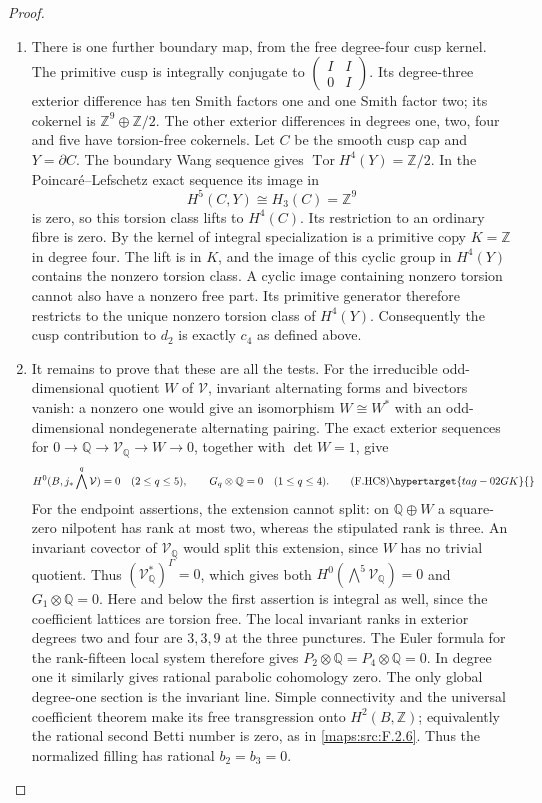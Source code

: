 \begin{proof}
\begin{enumerate}[label={$\langle1\rangle$\arabic*.}]
\item There is one further boundary map, from the free
degree-four cusp kernel.
The primitive cusp is integrally conjugate to
$\left(\begin{smallmatrix}I&I\\0&I\end{smallmatrix}\right)$.
Its degree-three exterior difference has ten Smith
factors one and one Smith factor two; its cokernel is
$\mathbb Z^9\oplus\mathbb Z/2$.
The other exterior differences in degrees one, two,
four and five have torsion-free cokernels.
Let $C$ be the smooth cusp cap and $Y=\partial C$.
The boundary Wang sequence gives
$\operatorname{Tor}H^4(Y)=\mathbb Z/2$.
In the Poincar\'e--Lefschetz exact sequence its image in
\[
 H^5(C,Y)\cong H_3(C)=\mathbb Z^9
\]
is zero, so this torsion class lifts to $H^4(C)$.
Its restriction to an ordinary fibre is zero.
By  the kernel of integral specialization is
a primitive copy $K=\mathbb Z$ in degree four.
The lift is in $K$, and the image of this cyclic group
in $H^4(Y)$ contains the nonzero torsion class.
A cyclic image containing nonzero torsion cannot
also have a nonzero free part.
Its primitive generator therefore restricts to the
unique nonzero torsion class of $H^4(Y)$.
Consequently the cusp contribution to $d_2$ is exactly $c_4$
as defined above.

\item It remains to prove that these are all the tests.
For the irreducible odd-dimensional quotient $W$
of $\mathcal V$, invariant alternating forms and
bivectors vanish: a nonzero one would give an
isomorphism $W\cong W^*$ with an odd-dimensional
nondegenerate alternating pairing.
The exact exterior sequences for
$0\to\mathbb Q\to\mathcal V_{\mathbb Q}\to W\to0$,
together with $\det W=1$, give
\[
 H^0(B,j_*\bigwedge^q\mathcal V)=0
       \quad(2\le q\le5),\qquad
 G_q\otimes\mathbb Q=0\quad(1\le q\le4).
 \tag{F.HC8}\hypertarget{tag-02GK}{}\label{maps:eq:F.HC8}
\]
For the endpoint assertions, the extension cannot split:
on $\mathbb Q\oplus W$ a square-zero nilpotent has rank at
most two, whereas the stipulated rank is three.
An invariant covector of $\mathcal V_{\mathbb Q}$ would
split this extension, since $W$ has no trivial quotient.
Thus $(\mathcal V_{\mathbb Q}^*)^\Gamma=0$, which gives
both $H^0(\bigwedge^5\mathcal V_{\mathbb Q})=0$ and
$G_1\otimes\mathbb Q=0$.
Here and below the first assertion is integral as well,
since the coefficient lattices are torsion free.
The local invariant ranks in exterior degrees two
and four are $3,3,9$ at the three punctures.
The Euler formula for the rank-fifteen local system
therefore gives $P_2\otimes\mathbb Q=P_4\otimes\mathbb Q=0$.
In degree one it similarly gives rational parabolic
cohomology zero.
The only global degree-one section is the invariant
line.  Simple connectivity and the universal
coefficient theorem make its free transgression
onto $H^2(B,\mathbb Z)$; equivalently the rational
second Betti number is zero, as in \ref{maps:src:F.2.6}.
Thus the normalized filling has rational $b_2=b_3=0$.


\end{enumerate}
\end{proof}
